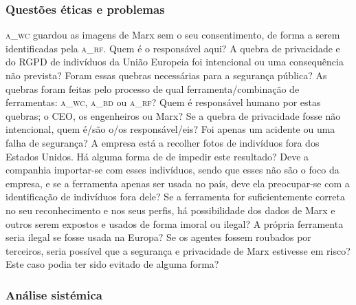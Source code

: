 \documentclass[12pt]{../diazessay}
\begin{document}
\subsubsection*{Questões éticas e problemas}
\textsc{a\_wc} guardou as imagens de Marx sem o seu consentimento, de forma a serem identificadas pela \textsc{a\_rf}. Quem é o responsável aqui? A quebra de privacidade e do RGPD de indivíduos da União Europeia foi intencional ou uma consequência não prevista? Foram essas quebras necessárias para a segurança pública? As quebras foram feitas pelo processo de qual ferramenta/combinação de ferramentas: \textsc{a\_wc}, \textsc{a\_bd} ou \textsc{a\_rf}? Quem é responsável humano por estas quebras; o CEO, os engenheiros ou Marx? Se a quebra de privacidade fosse não intencional, quem é/são o/os responsável/eis? Foi apenas um acidente ou uma falha de segurança? A empresa está a recolher fotos de indivíduos fora dos Estados Unidos. Há alguma forma de de impedir este resultado? Deve a companhia importar-se com esses indivíduos, sendo que esses não são o foco da empresa, e se a ferramenta apenas ser usada no país, deve ela preocupar-se com a identificação de indivíduos fora dele? Se a ferramenta for suficientemente correta no seu reconhecimento e nos seus perfis, há possibilidade dos dados de Marx e outros serem expostos e usados de forma imoral ou ilegal? A própria ferramenta seria ilegal se fosse usada na Europa? Se os agentes fossem roubados por terceiros, seria possível que a segurança e privacidade de Marx estivesse em risco? Este caso podia ter sido evitado de alguma forma?
\subsubsection*{Análise sistémica}

\printbibliography[title=Referências]
\end{document}
